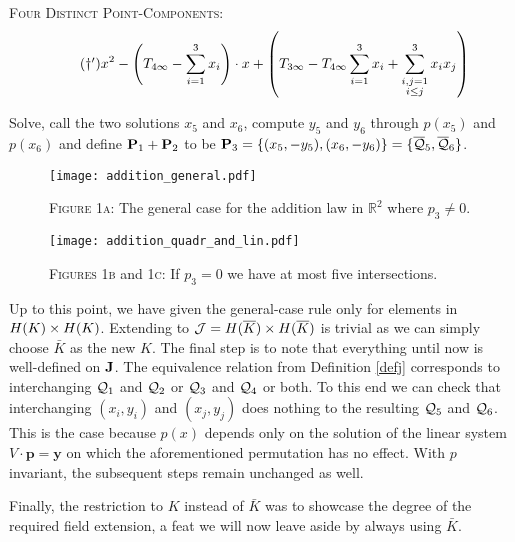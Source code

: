 \documentclass[english,11pt,a4paper]{article}
\begin{document}
\begin{case} {\scshape Four Distinct Point-Components:}
  \vspace{-2mm}
  \fline
  \begin{align*}
    \label{daggerp} \tag{$\dagger '$} x^2 - \left( T_{4\infty} - \sumthr \right) \cdot x + \left(T_{3\infty} - T_{4\infty} \sumthr + \sum_{\substack{i,j=1\\i\leq j}}^3 x_i x_j \right)
  \end{align*}
  \fline

  Solve, call the two solutions $x_5$ and $x_6$, compute $y_5$ and $y_6$ through $p(x_5)$ and $p(x_6)$ and define $\P_1+\P_2$ to be $\P_3=\{ (x_5,-y_5) , (x_6,-y_6) \}=\{ \bar \q_5, \bar \q_6 \}$.
\end{case}


\begin{figure}[ht!]
  \fline
  \begin{center}
    \vspace{1mm}
    \texttt{[image: addition\_general.pdf]}

    {\scshape Figure 1a}: The general case for the addition law in $\mathds{R}^2$ where $p_3 \neq 0$.

    \vspace{1mm}

    \texttt{[image: addition\_quadr\_and\_lin.pdf]}

    {\scshape Figures 1b} and {\scshape 1c}: If $p_3 = 0$ we have at most five intersections.
  \end{center}
  \vspace{-1.5mm}
  \fline
\end{figure}


\begin{remark}
  Up to this point, we have given the general-case rule only for elements in $\ek \times \ek$. Extending to $\j = \ekb \times \ekb$ is trivial as we can simply choose $\bar K$ as the new $K$. The final step is to note that everything until now is well-defined on $\J$. The equivalence relation from Definition \ref{defj} corresponds to interchanging $\q_1$ and $\q_2$ or $\q_3$ and $\q_4$ or both.
  To this end we can check that interchanging $(x_i,y_i)$ and $(x_j,y_j)$ does nothing to the resulting $\q_5$ and $\q_6$. This is the case because $p(x)$ depends only on the solution of the linear system $V \cdot \mathbf{p} = \mathbf{y}$ on which the aforementioned permutation has no effect. With $p$ invariant, the subsequent steps remain unchanged as well.

  Finally, the restriction to $K$ instead of $\bar K$ was to showcase the degree of the required field extension, a feat we will now leave aside by always using $\bar K$.
\end{remark}
\end{document}
